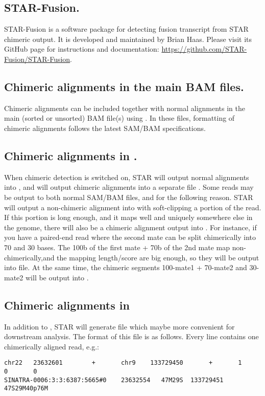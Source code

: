 \documentclass[12pt]{article}
\begin{document}
\subsection{STAR-Fusion.}
STAR-Fusion is a software package for detecting fusion transcript from STAR chimeric output. It is developed and maintained by Brian Haas. Please visit its GitHub page for instructions and documentation: \url{https://github.com/STAR-Fusion/STAR-Fusion}.

\subsection{Chimeric alignments in the main BAM files.}
Chimeric alignments can be included together with normal alignments in the main (sorted or unsorted) BAM file(s) using  . In these files, formatting of chimeric alignments follows the latest SAM/BAM specifications.
   
\subsection{Chimeric alignments in  .}
When chimeric detection is switched on, STAR will output normal alignments into , and will output chimeric alignments into a separate file . 
Some reads may be output to both normal SAM/BAM files, and  for the following reason. STAR will output a non-chimeric alignment into  with soft-clipping a portion of the read. If this portion is long enough, and it maps well and uniquely  somewhere else in the genome, there will also be a chimeric alignment output into . For instance, if you have a paired-end read where the second mate can be split chimerically into 70 and 30 bases. The 100b of the first mate + 70b of the 2nd mate map non-chimerically,and the mapping length/score are big enough, so they will be output into  file. At the same time, the chimeric segments 100-mate1 + 70-mate2 and 30-mate2 will be output into .

\subsection{Chimeric alignments in }
In addition to , STAR will generate  file which maybe more convenient for downstream analysis.
The format of this file is as follows. Every line contains one chimerically aligned read, e.g.:
\begin{verbatim}
chr22   23632601        +       chr9    133729450       +       1       0       0      
SINATRA-0006:3:3:6387:5665#0    23632554   47M29S  133729451       47S29M40p76M
\end{verbatim}
\end{document}

